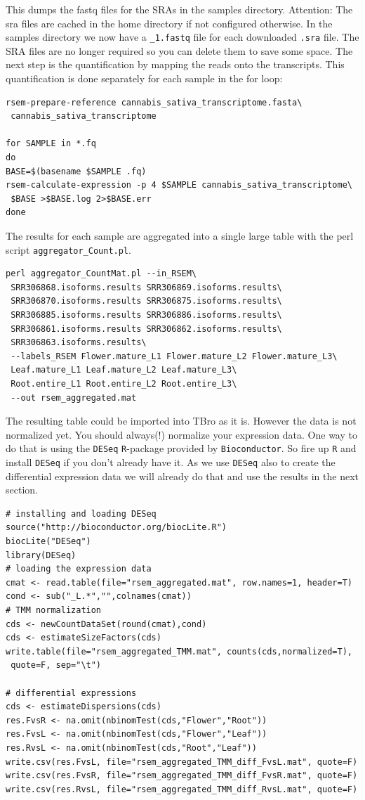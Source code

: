 \documentclass[english]{scrartcl}
\begin{document}
This dumps the fastq files for the SRAs in the samples directory. 
Attention: The sra files are cached in the home directory if not configured otherwise.
In the samples directory we now have a \texttt{\_1.fastq} file for each downloaded
\texttt{.sra} file. The SRA files are no longer required so you can delete them
to save some space. The next step is the quantification by mapping the reads
onto the transcripts. This quantification is done separately for each sample in
the for loop:
\begin{lstlisting}
rsem-prepare-reference cannabis_sativa_transcriptome.fasta\
 cannabis_sativa_transcriptome

for SAMPLE in *.fq
do
BASE=$(basename $SAMPLE .fq)
rsem-calculate-expression -p 4 $SAMPLE cannabis_sativa_transcriptome\
 $BASE >$BASE.log 2>$BASE.err
done
\end{lstlisting}
The results for each sample are aggregated into a single large table with the
perl script \texttt{aggregator\_Count.pl}.
\begin{lstlisting}
perl aggregator_CountMat.pl --in_RSEM\
 SRR306868.isoforms.results SRR306869.isoforms.results\
 SRR306870.isoforms.results SRR306875.isoforms.results\
 SRR306885.isoforms.results SRR306886.isoforms.results\
 SRR306861.isoforms.results SRR306862.isoforms.results\
 SRR306863.isoforms.results\
 --labels_RSEM Flower.mature_L1 Flower.mature_L2 Flower.mature_L3\
 Leaf.mature_L1 Leaf.mature_L2 Leaf.mature_L3\
 Root.entire_L1 Root.entire_L2 Root.entire_L3\
 --out rsem_aggregated.mat
\end{lstlisting}
The resulting table could be imported into
TBro as it is. However the data is not normalized yet. You should always(!)
normalize your expression data. One way to do that is using the \texttt{DESeq}
\texttt{R}-package provided by \texttt{Bioconductor}. So fire up \texttt{R} and
install \texttt{DESeq} if you don't already have it. As we use \texttt{DESeq}
also to create the differential expression data we will already do that and use
the results in the next section.

\begin{lstlisting}[style=R]
# installing and loading DESeq
source("http://bioconductor.org/biocLite.R")
biocLite("DESeq")
library(DESeq)
# loading the expression data
cmat <- read.table(file="rsem_aggregated.mat", row.names=1, header=T)
cond <- sub("_L.*","",colnames(cmat))
# TMM normalization
cds <- newCountDataSet(round(cmat),cond)
cds <- estimateSizeFactors(cds)
write.table(file="rsem_aggregated_TMM.mat", counts(cds,normalized=T),
 quote=F, sep="\t")

# differential expressions
cds <- estimateDispersions(cds)
res.FvsR <- na.omit(nbinomTest(cds,"Flower","Root"))
res.FvsL <- na.omit(nbinomTest(cds,"Flower","Leaf"))
res.RvsL <- na.omit(nbinomTest(cds,"Root","Leaf"))
write.csv(res.FvsL, file="rsem_aggregated_TMM_diff_FvsL.mat", quote=F) 
write.csv(res.FvsR, file="rsem_aggregated_TMM_diff_FvsR.mat", quote=F)
write.csv(res.RvsL, file="rsem_aggregated_TMM_diff_RvsL.mat", quote=F)
\end{lstlisting}
\end{document}
